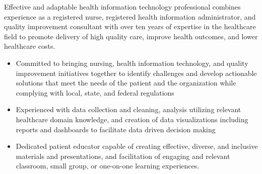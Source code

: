 

\begin{cvparagraph}

Effective and adaptable health information technology professional combines experience as a registered nurse, registered health information administrator, and quality improvement consultant with over ten years of expertise in the healthcare field to promote delivery of high quality care, improve health outcomes, and lower healthcare costs.
    \begin{itemize}[topsep=0pt,itemsep=0pt,parsep=0pt,partopsep=0pt,leftmargin=4mm]
      \item Committed to bringing nursing, health information technology, and quality improvement initiatives together to identify challenges and develop actionable solutions that meet the needs of the patient and the organization while complying with local, state, and federal regulations
      \item Experienced with data collection and cleaning, analysis utilizing relevant healthcare domain knowledge, and creation of data visualizations including reports and dashboards to facilitate data driven decision making
      \item Dedicated patient educator capable of creating effective, diverse, and inclusive materials and presentations, and facilitation of engaging and relevant classroom, small group, or one-on-one learning experiences.
    \end{itemize}
\end{cvparagraph}
